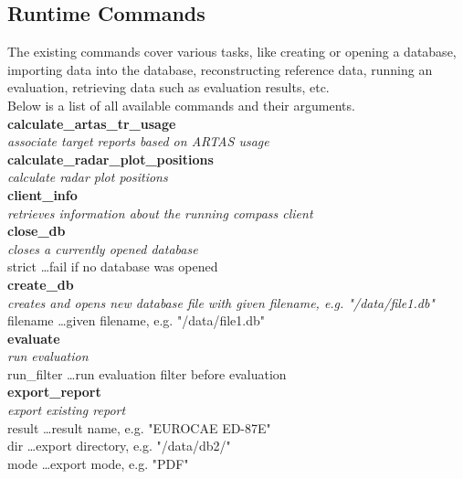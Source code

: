 \subsection{Runtime Commands}

The existing commands cover various tasks, like creating or opening a database,
importing data into the database, reconstructing reference data, running an evaluation,
retrieving data such as evaluation results, etc. \\

Below is a list of all available commands and their arguments. \\

\textbf{calculate\_artas\_tr\_usage} \\
\textit{associate target reports based on ARTAS usage} \\

\textbf{calculate\_radar\_plot\_positions} \\
\textit{calculate radar plot positions} \\

\textbf{client\_info} \\
\textit{retrieves information about the running compass client} \\

\textbf{close\_db} \\
\textit{closes a currently opened database} \\
strict \dots fail if no database was opened \\

\textbf{create\_db} \\
\textit{creates and opens new database file with given filename, e.g. "/data/file1.db"} \\
filename \dots given filename, e.g. "/data/file1.db" \\

\textbf{evaluate} \\
\textit{run evaluation} \\
run\_filter \dots run evaluation filter before evaluation \\

\textbf{export\_report} \\
\textit{export existing report} \\
result \dots result name, e.g. "EUROCAE ED-87E" \\
dir \dots export directory, e.g. "/data/db2/" \\
mode \dots export mode, e.g. "PDF" \\

